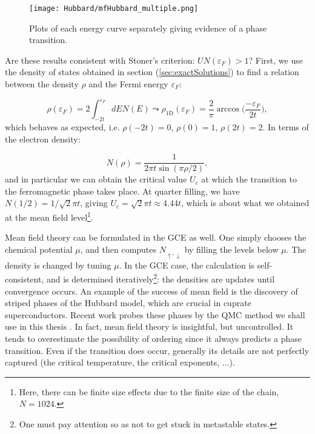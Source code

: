 \begin{figure}[H]
	\centering
\texttt{[image: Hubbard/mfHubbard\_multiple.png]}
	\caption[Mean field results for the \acs{1D} Hubbard model: closing in on the phase transition.]{Plots of each energy curve separately giving evidence of a phase transition.
	}
	\label{fig:mft_multiple}
\end{figure}

Are these results consistent with Stoner's criterion: $U N ( \varepsilon_F ) > 1$?
First, we use the density of states obtained in section (\ref{sec:exactSolutions}) to find a relation between the density $\rho$ and the Fermi energy $\varepsilon_F$:

\begin{equation}
\rho ( \varepsilon_F ) = 2 \int_{-2t}^{\varepsilon_F} dE N ( E ) \leadsto \rho_{\text{1D}} ( \varepsilon_F ) = \frac{2}{\pi} \arccos\bigg( \frac{-\varepsilon_F}{2t}\bigg) ,
\end{equation}
which behaves as expected, i.e. $\rho ( -2 t ) = 0$,  $\rho ( 0 ) = 1$, $\rho ( 2 t ) = 2$.
In terms of the electron density:

\begin{equation}
N ( \rho ) = \frac{1}{2\pi t \sin(\pi \rho / 2)} ,
\end{equation}
and in particular we can obtain the critical value $U_c$ at which the transition to the ferromagnetic phase takes place.
At quarter filling, we have $N( 1 / 2 ) = 1 /\sqrt{2} \pi t$, giving $U_c = \sqrt{2} \pi t \approx 4.44 t$, which is about what we obtained at the mean field level\footnote{Here, there can be finite size effects due to the finite size of the chain, $N = 1024$.}.

Mean field theory can be formulated in the \ac{GCE} as well.
One simply chooses the chemical potential $\mu$, and then computes $N_{\uparrow, \downarrow}$ by filling the levels below $\mu$.
The density is changed by tuning $\mu$.
In the \ac{GCE} case, the calculation is self-consistent, and is determined iteratively\footnote{One must pay attention so as not to get stuck in metastable states.}: the densities are updates until convergence occurs.
An example of the success of mean field is the discovery of striped phases of the Hubbard model, which are crucial in cuprate superconductors.
Recent work probes these phases by the \ac{QMC} method we shall use in this thesis \cite{huang_stripe_2018}.
In fact, mean field theory is insightful, but uncontrolled.
It tends to overestimate the possibility of ordering since it always predicts a phase transition.
Even if the transition does occur, generally its details are not perfectly captured (the critical temperature, the critical exponents, ...).